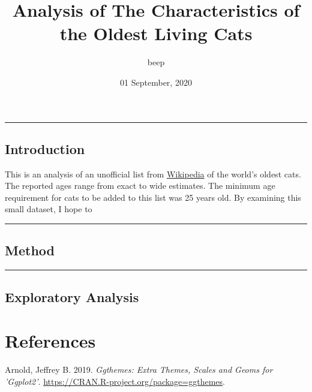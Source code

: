 \documentclass[
]{article}
\title{Analysis of The Characteristics of the Oldest Living Cats}
\author{beep}
\date{01 September, 2020}
\begin{document}
\maketitle

\begin{center}\rule{0.5\linewidth}{0.5pt}\end{center}

\hypertarget{introduction}{%
\subsection{Introduction}\label{introduction}}

This is an analysis of an unofficial list from
\href{https://en.wikipedia.org/wiki/List_of_oldest_cats}{Wikipedia} of
the world's oldest cats. The reported ages range from exact to wide
estimates. The minimum age requirement for cats to be added to this list
was 25 years old. By examining this small dataset, I hope to

\begin{center}\rule{0.5\linewidth}{0.5pt}\end{center}

\hypertarget{method}{%
\subsection{Method}\label{method}}

\begin{center}\rule{0.5\linewidth}{0.5pt}\end{center}

\hypertarget{exploratory-analysis}{%
\subsection{Exploratory Analysis}\label{exploratory-analysis}}

\hypertarget{htmlwidget-6618231e88a17c37d763}{}
\begin{plotly}

\end{plotly}

\hypertarget{references}{%
\section*{References}\label{references}}

\hypertarget{refs}{}
\leavevmode\hypertarget{ref-R-ggthemes}{}%
Arnold, Jeffrey B. 2019. \emph{Ggthemes: Extra Themes, Scales and Geoms
for 'Ggplot2'}. \url{https://CRAN.R-project.org/package=ggthemes}.
\end{document}
